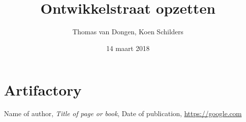 \documentclass[12pt]{article}
\title{Ontwikkelstraat opzetten}
\author{Thomas van Dongen, Koen Schilders}
\date{14 maart 2018}
\begin{document}
\begin{titlepage}
\maketitle
\end{titlepage}



\section{Artifactory}





\begin{thebibliography}{9}
	Name of author,
	\textit{Title of page or book},
	Date of publication,
	\url{https://google.com}
\end{thebibliography}
\end{document}
